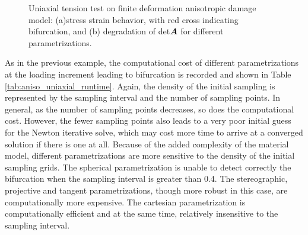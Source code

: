 \documentclass[12pt]{article}
\numberwithin{equation}{section}
\begin{document}
\begin{figure}[H]
  \centering {} 
  \caption{Uniaxial tension test on finite deformation 
  anisotropic damage model: 
  (a)stress strain behavior, with red cross indicating bifurcation, and
  (b) degradation of det${\boldsymbol{A}}$ for different
  parametrizations.}
  \label{fig:aniso_stress_stretch}
\end{figure}

As in the previous example, the computational cost of different 
parametrizations at the loading increment leading to bifurcation is 
recorded and shown in Table \ref{tab:aniso_uniaxial_runtime}. Again, 
the density of the initial sampling is represented by the sampling 
interval and the number of sampling points. In general, as the number 
of sampling points decreases, so does the computational cost. However, 
the fewer sampling points also leads to a very poor initial guess for 
the Newton iterative solve, which may cost more time to arrive at a 
converged solution if there is one at all. Because of the added 
complexity of the material model, different parametrizations are more 
sensitive to the density of the initial sampling grids. The spherical 
parametrization is unable to detect correctly the bifurcation when the 
sampling interval is greater than 0.4. The stereographic, projective 
and tangent parametrizations, though more robust in this case, are 
computationally more expensive. The cartesian parametrization is 
computationally efficient and at the same time, relatively insensitive 
to the sampling interval. 
\end{document}

